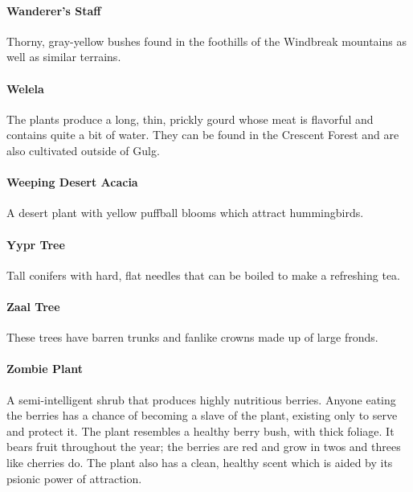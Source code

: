 \begin{multicols}{2}
\paragraph{Wanderer's Staff}
Thorny, gray-yellow bushes found in the foothills of the
Windbreak mountains as well as similar terrains.

\paragraph{Welela}
The plants produce a long, thin, prickly gourd whose meat is
flavorful and contains quite a bit of water. They can be found
in the Crescent Forest and are also cultivated outside of Gulg.

\paragraph{Weeping Desert Acacia}
A desert plant with yellow puffball blooms which attract hummingbirds.

\paragraph{Yypr Tree}
Tall conifers with hard, flat needles that can be boiled to make a refreshing tea.

\paragraph{Zaal Tree}
These trees have barren trunks and fanlike crowns made up of large fronds.

\paragraph{Zombie Plant}
A semi-intelligent shrub that produces highly nutritious berries.
Anyone eating the berries has a chance of becoming a slave of the plant,
existing only to serve and protect it. The plant resembles a healthy
berry bush, with thick foliage. It bears fruit throughout the year;
the berries are red and grow in twos and threes like cherries do.
The plant also has a clean, healthy scent which is aided by its
psionic power of attraction.

\end{multicols}
